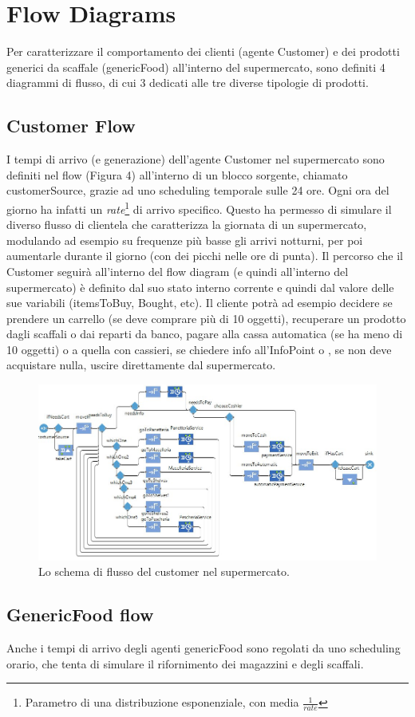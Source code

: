 \documentclass{article}
\begin{document}
\section{Flow Diagrams}
Per caratterizzare il comportamento dei clienti (agente Customer) e dei prodotti generici da scaffale (genericFood) all'interno del supermercato, sono definiti 4 diagrammi di flusso, di cui 3 dedicati alle tre diverse tipologie di prodotti.
\subsection{Customer Flow}
I tempi di arrivo (e generazione) dell'agente Customer nel supermercato sono definiti nel flow (Figura 4) all'interno di un blocco sorgente, chiamato \textsf{customerSource}, grazie ad uno scheduling temporale sulle 24 ore. Ogni ora del giorno ha infatti un \textit{rate}\footnote{Parametro di una distribuzione esponenziale, con media $\frac{1}{rate} $ } di arrivo specifico. Questo ha permesso di simulare il diverso flusso di clientela che caratterizza la giornata di un supermercato, modulando ad esempio su frequenze più basse gli arrivi notturni, per poi aumentarle durante il giorno (con dei picchi nelle ore di punta).
\newline
\newline
Il percorso che il Customer seguirà all'interno del flow diagram (e quindi all'interno del supermercato) è definito dal suo stato interno corrente e quindi dal valore delle sue variabili (itemsToBuy, Bought, etc). Il cliente potrà ad esempio decidere se prendere un carrello (se deve comprare più di 10 oggetti), recuperare un prodotto dagli scaffali o dai reparti da banco, pagare alla cassa automatica (se ha meno di 10 oggetti) o a quella con cassieri, se chiedere info all'InfoPoint o , se non deve acquistare nulla, uscire direttamente dal supermercato.

\begin{center}
\begin{figure}[h]
\center
\label{custflow}
\includegraphics[scale=0.5]{./cust_flow.jpg}
\caption{\footnotesize{Lo schema di flusso del customer nel supermercato.}}
\end{figure}
\end{center}

\subsection{GenericFood flow}
Anche i tempi di arrivo degli agenti genericFood sono regolati da uno scheduling orario, che tenta di simulare il rifornimento dei magazzini e degli scaffali.
\end{document}
